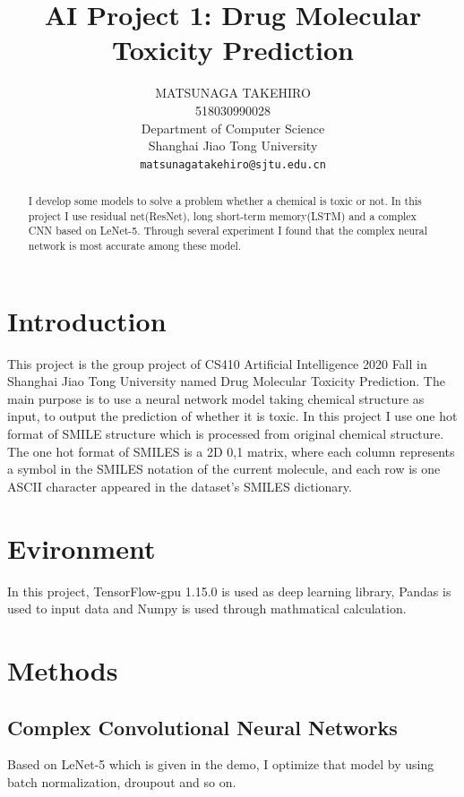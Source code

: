 \documentclass{article}
\title{AI Project 1: Drug Molecular Toxicity Prediction}
\author{
MATSUNAGA TAKEHIRO \\
518030990028\\
Department of Computer Science\\
Shanghai Jiao Tong University\\
\texttt{matsunagatakehiro@sjtu.edu.cn} \\
}
\begin{document}
\maketitle

\begin{abstract}
 I develop some models to solve a problem whether a chemical is toxic or not. In this project I use residual net(ResNet), long short-term memory(LSTM) and a complex CNN based on LeNet-5. Through several experiment I found that the complex neural network is most accurate among these model.
\end{abstract}

\section{Introduction}
This project is the group project of CS410 Artificial Intelligence 2020 Fall in Shanghai Jiao Tong University named Drug Molecular Toxicity Prediction. The main purpose is to use a neural network model taking chemical structure as input, to output the prediction of whether it is toxic. In this project I use one hot format of SMILE structure which is processed from original chemical structure. The one hot format of SMILES is a 2D {0,1} matrix, where each column represents a symbol in the SMILES notation of the current molecule, and each row is one ASCII character appeared in the dataset’s SMILES dictionary.

\section{Evironment}
In this project, TensorFlow-gpu 1.15.0 is used as deep learning library, Pandas is used to input data and Numpy is used through mathmatical calculation.

\section{Methods}
\subsection{Complex Convolutional Neural Networks}
Based on LeNet-5 which is given in the demo, I optimize that model by using batch normalization, droupout and so on. 
\end{document}

